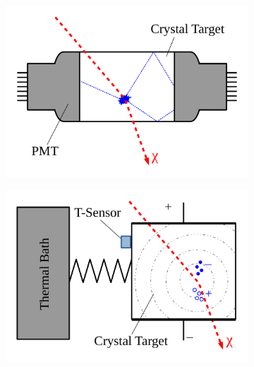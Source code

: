 \begin{figure}[!h]
     \centering
     \begin{subfigure}{0.49\textwidth}
         \centering
         \includegraphics[width=\textwidth]{figures/DMOverview/crystal.pdf}
         \caption{}
         \label{fig:DMOverview/crystal}
     \end{subfigure}
     \hfill
     \begin{subfigure}{0.49\textwidth}
         \centering
         \includegraphics[width=\textwidth]{figures/DMOverview/cryogenic.pdf}
         \caption{}
         \label{fig:DMOverview/cryogenic}
     \end{subfigure}
     \hfill
     \begin{subfigure}{0.49\textwidth}
         \centering

\end{subfigure}
\end{figure}
